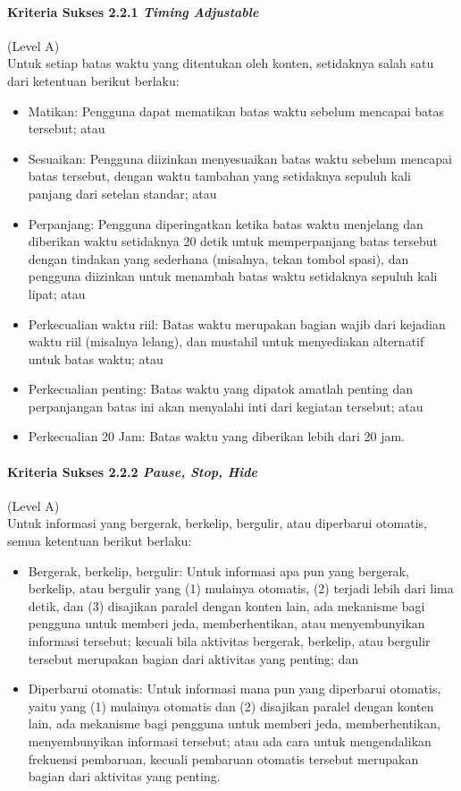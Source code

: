 \paragraph{Kriteria Sukses 2.2.1 \textit{Timing Adjustable}}
\label{sec:kriteria_sukses_2.2.1}
(Level A)\\

Untuk setiap batas waktu yang ditentukan oleh konten, setidaknya salah satu dari ketentuan berikut berlaku:
\begin{itemize}
	\item Matikan: Pengguna dapat mematikan batas waktu sebelum mencapai batas tersebut; atau
	\item Sesuaikan: Pengguna diizinkan menyesuaikan batas waktu sebelum mencapai batas tersebut, dengan waktu tambahan yang setidaknya sepuluh kali panjang dari setelan standar; atau
	\item Perpanjang: Pengguna diperingatkan ketika batas waktu menjelang dan diberikan waktu setidaknya 20 detik untuk memperpanjang batas tersebut dengan tindakan yang sederhana (misalnya, tekan tombol spasi), dan pengguna diizinkan untuk menambah batas waktu setidaknya sepuluh kali lipat; atau
	\item Perkecualian waktu riil: Batas waktu merupakan bagian wajib dari kejadian waktu riil (misalnya lelang), dan mustahil untuk menyediakan alternatif untuk batas waktu; atau
	\item Perkecualian penting: Batas waktu yang dipatok amatlah penting dan perpanjangan batas ini akan menyalahi inti dari kegiatan tersebut; atau
	\item Perkecualian 20 Jam: Batas waktu yang diberikan lebih dari 20 jam.
\end{itemize}

\paragraph{Kriteria Sukses 2.2.2 \textit{Pause, Stop, Hide}}
\label{sec:kriteria_sukses_2.2.2}
(Level A)\\

Untuk informasi yang bergerak, berkelip, bergulir, atau diperbarui otomatis, semua ketentuan berikut berlaku:
\begin{itemize}
	\item Bergerak, berkelip, bergulir: Untuk informasi apa pun yang bergerak, berkelip, atau bergulir yang (1) mulainya otomatis, (2) terjadi lebih dari lima detik, dan (3) disajikan paralel dengan konten lain, ada mekanisme bagi pengguna untuk memberi jeda, memberhentikan, atau menyembunyikan informasi tersebut; kecuali bila aktivitas bergerak, berkelip, atau bergulir tersebut merupakan bagian dari aktivitas yang penting; dan
	\item Diperbarui otomatis: Untuk informasi mana pun yang diperbarui otomatis, yaitu yang (1) mulainya otomatis dan (2) disajikan paralel dengan konten lain, ada mekanisme bagi pengguna untuk memberi jeda, memberhentikan, menyembunyikan informasi tersebut; atau ada cara untuk mengendalikan frekuensi pembaruan, kecuali pembaruan otomatis tersebut merupakan bagian dari aktivitas yang penting.
\end{itemize}

